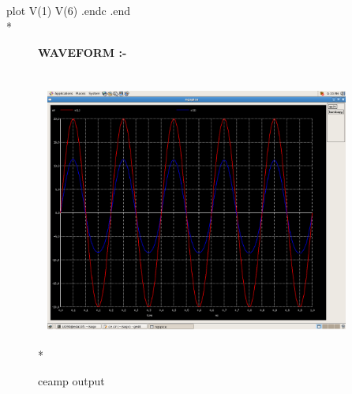 \documentclass{article}
\begin{document}
\begin{flushleft}
{{plot V(1)  V(6) \newline
.endc \newline
.end \newline}}\\*
\begin{figure}[ht]
\large{{\bf\textcolor{rosewood}{ WAVEFORM} :-}}\vspace{5mm} \\*
\includegraphics[width=10cm, height=10cm]{ce.png}
\caption{ceamp output} 
\label{fig:circuit3} 
\end{figure}
\end{flushleft}
\newpage
\end{document}
